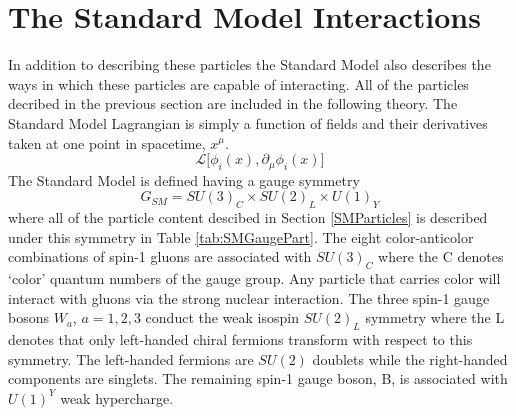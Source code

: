 \section{The Standard Model Interactions}
In addition to describing these particles the Standard Model also describes the ways in which these particles are capable of interacting.  All of the particles decribed in the previous section are included in the following theory.  The Standard Model Lagrangian is simply a function of fields and their derivatives taken at one point in spacetime, $x^{\mu}$.  
 \[ \mathcal{L} \lbrack \phi_{i}(x),\partial_{\mu}\phi_{i}(x) \rbrack \] 
The Standard Model is defined having a gauge symmetry
\[ G_{SM} =SU(3)_C \times SU(2)_L \times U(1)_Y \]
where all of the particle content descibed in Section \ref{SMParticles} is described under this symmetry in Table \ref{tab:SMGaugePart}\cite{GrossmanLecture}.  The eight color-anticolor combinations of spin-1 gluons are associated with $SU(3)_C$ where the C denotes `color' quantum numbers of the gauge group.  Any particle that carries color will interact with gluons via the strong nuclear interaction.  The three spin-1 gauge bosons $W_a$, $a=1,2,3$ conduct the weak isospin $SU(2)_L$ symmetry where the L denotes that only left-handed chiral fermions transform with respect to this symmetry.  The left-handed fermions are $SU(2)$ doublets while the right-handed components are singlets.  The remaining spin-1 gauge boson, B, is associated with $U(1)^Y$ weak hypercharge.  
